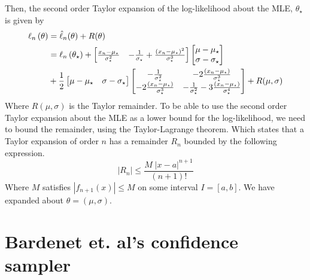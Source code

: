 \documentclass{article}
\theoremstyle{definition}
\begin{document}
Then, the second order Taylor expansion of the log-likelihood about the MLE, $\theta_{\star}$ is given by 
\begin{align}
    \ell_n\left(\theta\right) &= \hat{\ell}_n(\theta) + R(\theta) \\ & = \ell_n\left(\theta_{\star}\right) + \begin{bmatrix} \frac{x_n - \mu_{\star}}{\sigma_{\star}^2}&
-\frac{1}{\sigma_{\star}} + \frac{\left(x_n - \mu_{\star}\right)^2}{\sigma_{\star}^3}\end{bmatrix} \begin{bmatrix} \mu - \mu_{\star} \\   \sigma - \sigma_{\star} \end{bmatrix} \\ &+ \frac{1}{2} \begin{bmatrix} \mu - \mu_{\star} & \sigma - \sigma_{\star} \end{bmatrix} \begin{bmatrix}- \frac{1}{\sigma_{\star}^2} & - 2\frac{\left(x_n - \mu_{\star}\right)}{\sigma_{\star}^3} \\ -2\frac{\left(x_n - \mu_{\star}\right)}{\sigma_{\star}^3} & - \frac{1}{\sigma_{\star}^2} - 3\frac{\left(x_n - \mu_{\star}\right)}{\sigma_{\star}^4}\end{bmatrix}  + R(\mu, \sigma)\notag 
\end{align}
Where $R(\mu, \sigma)$ is the Taylor remainder. To be able to use the second order Taylor expansion about the MLE as a lower bound for the log-likelihood, we need to bound the remainder, using the Taylor-Lagrange theorem. Which states that a Taylor expansion of order $n$ has a remainder $R_n$ bounded by the following expression. 
\begin{equation}\label{eq:taylor_lagr}
|R_n| \leq \frac{M\;|x-a|^{n+1}}{\left(n+1\right)!}
\end{equation}
Where $M$ satisfies $|f_{n+1}\left(x\right)| \leq M$ on some interval $I = \left[a, b\right]$. 
We have expanded about $\theta = \left(\mu, \sigma\right)$.   
\section{Bardenet et. al's confidence sampler}
\end{document}
